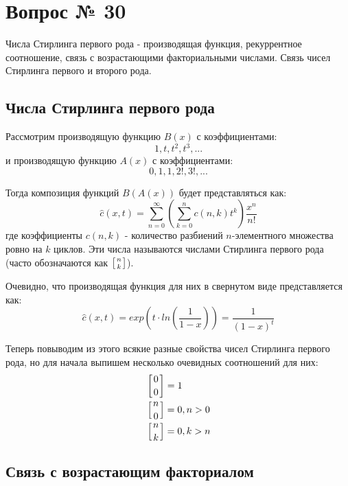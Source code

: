 \chapter{Вопрос № 30}

Числа Стирлинга первого рода - производящая функция, рекуррентное соотношение, связь с возрастающими факториальными числами. Связь чисел Стирлинга первого и второго рода.

\section{Числа Стирлинга первого рода}

Рассмотрим производящую функцию $B\left(x\right)$ с коэффициентами:
\[
	1, t, t^2, t^3, ...
\]
и производящую функцию $A\left(x\right)$ с коэффициентами:
\[
	0, 1, 1, 2!, 3!, ...
\]

Тогда композиция функций $B\left(A\left(x\right)\right)$ будет представляться как:
\[
	\hat c\left(x,t\right) = \sum_{n=0}^{\infty}\left(\sum_{k=0}^n c\left(n,k\right) t^k\right) \frac{x^n}{n!}
\]
где коэффициенты $c\left(n,k\right)$ - количество разбиений $n$-элементного множества ровно на $k$ циклов. Эти числа называются числами Стирлинга первого рода (часто обозначаются как $\left[n \atop k\right]$).

Очевидно, что производящая функция для них в свернутом виде представляется как:
\[
	\hat c\left(x,t\right) = exp\left(t\cdot ln\left(\frac{1}{1-x}\right)\right) = \frac{1}{\left(1-x\right)^t}
\]

Теперь повыводим из этого всякие разные свойства чисел Стирлинга первого рода, но для начала выпишем несколько очевидных соотношений для них:
\[
	\begin{split}
		& \left[0\atop 0\right] = 1\\
		& \left[n\atop 0\right] = 0, n > 0\\
		& \left[n\atop k\right] = 0, k > n
	\end{split}
\]

\section{Связь с возрастающим факториалом}


